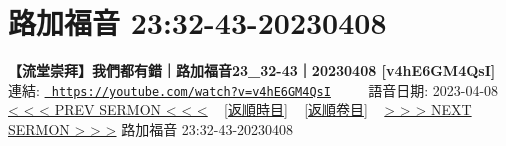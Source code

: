\documentclass{book}
\begin{document}
\section{路加福音 23:32-43-20230408}
\label{sec:v4hE6GM4QsI}
\textbf{【流堂崇拜】我們都有錯｜路加福音23\_32-43｜20230408 [v4hE6GM4QsI]}
\newline
\newline
連結: \href{https://youtube.com/watch?v=v4hE6GM4QsI}{\texttt{ https://youtube.com/watch?v=v4hE6GM4QsI}} ~~~~ 語音日期: 2023-04-08 
\newline
\newline
\hyperref[sec:8KdYgVn_hzk]{\small{< < < PREV SERMON < < <}}
~
\hyperref[sec:index_chronic]{\small{[返順時目]}}
~
\hyperref[sec:index_scriptual]{\small{[返順卷目]}}
~
\hyperref[sec:3PY1nwdp_0k]{\small{> > > NEXT SERMON > > >}}
\newline
\newline
路加福音 23:32-43-20230408
\newline
\end{document}
